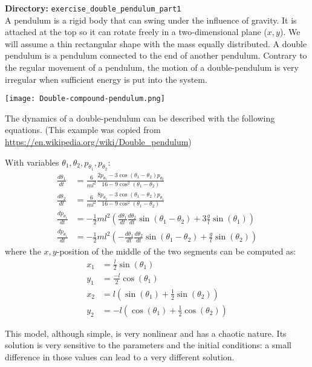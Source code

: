 {\bf Directory:} \lstinline{exercise_double_pendulum_part1}\\

A pendulum is a rigid body that can swing under the influence of gravity. It is attached at the top so it can rotate freely in a two-dimensional plane ($x,y$).
We will assume a thin rectangular shape with the mass equally distributed. A double pendulum is a pendulum connected to the end of another pendulum. Contrary to the 
regular movement of a pendulum, the motion of a double-pendulum is very irregular when sufficient energy is put into the system. 

\begin{center}
    \texttt{[image: Double-compound-pendulum.png]}
\end{center}

The dynamics of a double-pendulum can be described with the following equations. 
(This example was copied from \url{https://en.wikipedia.org/wiki/Double_pendulum})

With variables $\theta_1, \theta_2, p_{\theta_1}, p_{\theta_2}$:
\begin{align}
   \frac{d \theta_1}{dt}&= \frac{6}{m l^2} \frac{2 p_{\theta_1} - 3\cos(\theta_1-\theta_2) p_{\theta_2}}
   {16-9 \cos^2(\theta_1-\theta_2)}\\
   \frac{d \theta_2}{dt}&= \frac{6}{m l^2} \frac{8 p_{\theta_2} - 3\cos(\theta_1-\theta_2) p_{\theta_1}}
   {16-9 \cos^2(\theta_1-\theta_2)}\\
   \frac{dp_{\theta_1}}{dt} &= -\frac{1}{2} ml^2 \left( \frac{d \theta_1}{dt} \frac{d \theta_2}{dt} \sin(\theta_1-\theta_2) + 3\frac{g}{l} \sin(\theta_1) \right)  \\
   \frac{dp_{\theta_1}}{dt} &= -\frac{1}{2} ml^2 \left( -\frac{d \theta_1}{dt} \frac{d \theta_2}{dt} \sin(\theta_1-\theta_2) + \frac{g}{l} \sin(\theta_2) \right) 
\end{align}
where the $x,y$-position of the middle of the two segments can be computed as:
\begin{align}
   x_1 &= \frac{l}{2} \sin(\theta_1) \\
   y_1 &= \frac{-l}{2} \cos(\theta_1) \\
   x_2 &= l ( \sin(\theta_1) + \frac{1}{2} \sin(\theta_2) ) \\
   y_2 &= -l ( \cos(\theta_1) + \frac{1}{2} \cos(\theta_2) )
\end{align}

This model, although simple, is very nonlinear and has a chaotic nature.  Its
solution is very sensitive to the parameters and the initial conditions: a
small difference in those values can lead to a very different solution.

